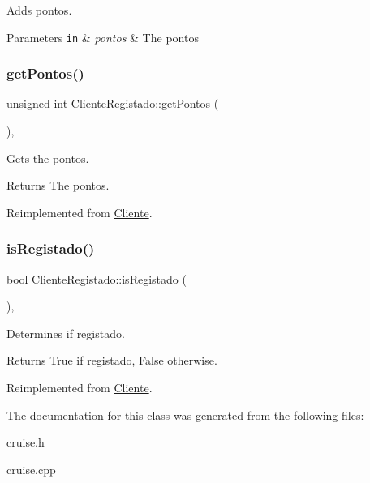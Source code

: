 Adds pontos. 


\begin{DoxyParams}[1]{Parameters}
\mbox{\tt in}  & {\em pontos} & The pontos \\
\hline
\end{DoxyParams}
\mbox{\label{classClienteRegistado_a0118e31f16e4dce542f5e1d124d26c61}} 
\subsubsection{\texorpdfstring{get\+Pontos()}{getPontos()}}
{\footnotesize\ttfamily unsigned int Cliente\+Registado\+::get\+Pontos (\begin{DoxyParamCaption}{ }\end{DoxyParamCaption})\hspace{0.3cm}{\ttfamily [inline]}, {\ttfamily [virtual]}}



Gets the pontos. 

\begin{DoxyReturn}{Returns}
The pontos. 
\end{DoxyReturn}


Reimplemented from \hyperlink{classCliente_a4bcd51f0d9a0bfe7d9d47074ac4e65de}{Cliente}.

\mbox{\label{classClienteRegistado_a3dade20423acb0e84c9fbe30c75f0e3e}} 
\subsubsection{\texorpdfstring{is\+Registado()}{isRegistado()}}
{\footnotesize\ttfamily bool Cliente\+Registado\+::is\+Registado (\begin{DoxyParamCaption}{ }\end{DoxyParamCaption})\hspace{0.3cm}{\ttfamily [inline]}, {\ttfamily [virtual]}}



Determines if registado. 

\begin{DoxyReturn}{Returns}
True if registado, False otherwise. 
\end{DoxyReturn}


Reimplemented from \hyperlink{classCliente_acb60d8bf04134b986ae56a79db8beaaf}{Cliente}.



The documentation for this class was generated from the following files\+:\begin{DoxyCompactItemize}
\item 
cruise.\+h\item 
cruise.\+cpp\end{DoxyCompactItemize}

